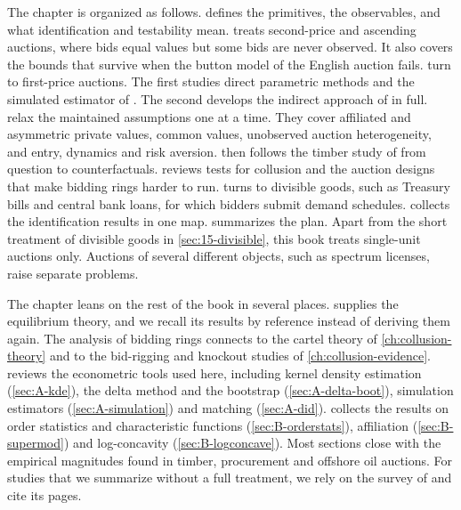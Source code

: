 The chapter is organized as follows.  defines the primitives, the observables, and what
identification and testability mean.  treats second-price and ascending auctions, where
bids equal values but some bids are never observed. It also covers the bounds that survive when the button
model of the English auction fails.  turn to first-price auctions. The first
studies direct parametric methods and the simulated estimator of \citet{LaffontOssardVuong1995}. The second
develops the indirect approach of \citet{GuerrePerrigneVuong2000} in full. 
relax the maintained assumptions one at a time. They cover affiliated and asymmetric private values, common
values, unobserved auction heterogeneity, and entry, dynamics and risk aversion.  then follows
the timber study of \citet{AtheyLevinSeira2011} from question to counterfactuals.  reviews
tests for collusion and the auction designs that make bidding rings harder to run. 
turns to divisible goods, such as Treasury bills and central bank loans, for which bidders submit demand
schedules.  collects the identification results in one map.
 summarizes the plan. Apart from the short treatment of divisible goods in
\cref{sec:15-divisible}, this book treats single-unit auctions only. Auctions of several different objects,
such as spectrum licenses, raise separate problems.

The chapter leans on the rest of the book in several places.  supplies the equilibrium
theory, and we recall its results by reference instead of deriving them again. The analysis of bidding rings
connects to the cartel theory of \cref{ch:collusion-theory} and to the bid-rigging and knockout studies of
\cref{ch:collusion-evidence}.  reviews the econometric tools used here, including kernel
density estimation (\cref{sec:A-kde}), the delta method and the bootstrap (\cref{sec:A-delta-boot}), simulation
estimators (\cref{sec:A-simulation}) and matching (\cref{sec:A-did}).  collects the results on order
statistics and characteristic functions (\cref{sec:B-orderstats}), affiliation (\cref{sec:B-supermod}) and
log-concavity (\cref{sec:B-logconcave}). Most
sections close with the empirical magnitudes found in timber, procurement and offshore oil auctions. For
studies that we summarize without a full treatment, we rely on the survey of \citet{HortacsuPerrigne2021}
and cite its pages.


